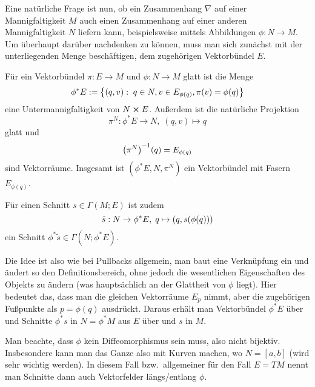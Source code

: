 \documentclass[../H_Analysis_main.tex]{subfiles}
\begin{document}
\iffalse
\begin{bsp}[Zweite Fundamentalform]
machen?
\end{bsp}
\fi


Eine natürliche Frage ist nun, ob ein Zusammenhang $\nabla$ auf einer Mannigfaltigkeit $M$ auch einen Zusammenhang auf einer anderen Mannigfaltigkeit $N$ liefern kann, beispielsweise mittels Abbildungen $\phi: N \rightarrow M$. Um überhaupt darüber nachdenken zu können, muss man sich zunächst mit der unterliegenden Menge beschäftigen, dem zugehörigen Vektorbündel $E$.

\begin{satz}
Für ein Vektorbündel $\pi: E \rightarrow M$ und $\phi: N \rightarrow M$ glatt ist die Menge
\begin{equation}
\phi^* E := \qty{(q, v): \; q \in N, v \in E_{\phi(q)}, \pi(v) = \phi(q)}
\end{equation}
eine Untermannigfaltigkeit von $N \cross E$. Außerdem ist die natürliche Projektion
\begin{equation}
\pi^N: \phi^* E \rightarrow N, \; (q, v) \mapsto q
\end{equation}
glatt und
\begin{equation}
\qty(\pi^N)^{-1}(q) = E_{\phi(q)}
\end{equation}
sind Vektorräume. Insgesamt ist $(\phi^* E, N, \pi^N)$ ein Vektorbündel mit Fasern $E_{\phi(q)}$.

Für einen Schnitt $s \in \Gamma(M; E)$ ist zudem
\begin{equation}
\tilde{s}: N \rightarrow \phi^* E, \; q \mapsto \qty(q, s\qty(\phi(q)))
\end{equation}
ein Schnitt $\phi^* \tilde{s} \in \Gamma(N; \phi^* E)$.
\end{satz}

Die Idee ist also wie bei Pullbacks allgemein, man baut eine Verknüpfung ein und ändert so den Definitionsbereich, ohne jedoch die wesentlichen Eigenschaften des Objekts zu ändern (was hauptsächlich an der Glattheit von $\phi$ liegt). Hier bedeutet das, dass man die gleichen Vektorräume $E_p$ nimmt, aber die zugehörigen Fußpunkte als $p = \phi(q)$ ausdrückt. Daraus erhält man Vektorbündel $\phi^* E$ über und Schnitte $\phi^* s$ in $N = \phi^* M$ aus $E$ über und $s$ in $M$.

Man beachte, dass $\phi$ kein Diffeomorphismus sein muss, also nicht bijektiv. Insbesondere kann man das Ganze also mit Kurven machen, wo $N = [a, b]$ (wird sehr wichtig werden). In diesem Fall bzw.~allgemeiner für den Fall $E = TM$ nennt man Schnitte dann auch Vektorfelder längs/entlang $\phi$.\\
\end{document}
